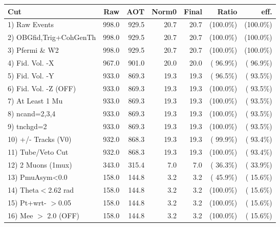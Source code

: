  \begin{table}[h!]\centering
 \begin{tabular}{||l||r|r|r|r|r|r||}
 \hline
 \hline
 Cut & Raw & AOT & Norm0 & Final & Ratio & eff.       \\
 \hline
  1) Raw Events           &        998.0 &        929.5 &         20.7 &         20.7 & (100.0\%) & (100.0\%) \\
  2) OBGfid,Trig+CohGenTh &        998.0 &        929.5 &         20.7 &         20.7 & (100.0\%) & (100.0\%) \\
  3) Pfermi \& W2         &        998.0 &        929.5 &         20.7 &         20.7 & (100.0\%) & (100.0\%) \\
  4) Fid. Vol. -X         &        967.0 &        901.0 &         20.0 &         20.0 & ( 96.9\%) & ( 96.9\%) \\
  5) Fid. Vol. -Y         &        933.0 &        869.3 &         19.3 &         19.3 & ( 96.5\%) & ( 93.5\%) \\
  6) Fid. Vol. -Z (OFF)   &        933.0 &        869.3 &         19.3 &         19.3 & (100.0\%) & ( 93.5\%) \\
  7) At Least 1 Mu        &        933.0 &        869.3 &         19.3 &         19.3 & (100.0\%) & ( 93.5\%) \\
  8) ncand=2,3,4          &        933.0 &        869.3 &         19.3 &         19.3 & (100.0\%) & ( 93.5\%) \\
  9) tnchgd=2             &        933.0 &        869.3 &         19.3 &         19.3 & (100.0\%) & ( 93.5\%) \\
 10) +/- Tracks (V0)      &        932.0 &        868.3 &         19.3 &         19.3 & ( 99.9\%) & ( 93.4\%) \\
 11) Tube/Veto Cut        &        932.0 &        868.3 &         19.3 &         19.3 & (100.0\%) & ( 93.4\%) \\
 12) 2 Muons (1mux)       &        343.0 &        315.4 &          7.0 &          7.0 & ( 36.3\%) & ( 33.9\%) \\
 13) PmuAsym<0.0          &        158.0 &        144.8 &          3.2 &          3.2 & ( 45.9\%) & ( 15.6\%) \\
 14) Theta$<$2.62 rad     &        158.0 &        144.8 &          3.2 &          3.2 & (100.0\%) & ( 15.6\%) \\
 15) Pt+wrt- $>$0.05      &        158.0 &        144.8 &          3.2 &          3.2 & (100.0\%) & ( 15.6\%) \\
 16) Mee $>$ 2.0  (OFF)   &        158.0 &        144.8 &          3.2 &          3.2 & (100.0\%) & ( 15.6\%) \\

\end{tabular}
\end{table}
